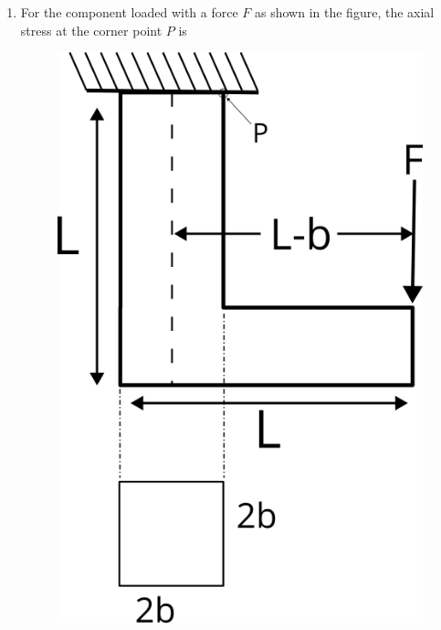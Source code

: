 \documentclass[journal,12pt,onecolumn]{IEEEtran}
\begin{document}
\begin{enumerate}[resume]
    \item For the component loaded with a force $F$ as shown in the figure, the axial stress at the corner point $P$ is
          \begin{figure}[H]
              \centering
              \includegraphics[scale=0.3]{q31}
              \caption{}
              \label{q31}
          \end{figure}

          \begin{enumerate}
          \end{enumerate}


\end{enumerate}
\end{document}
